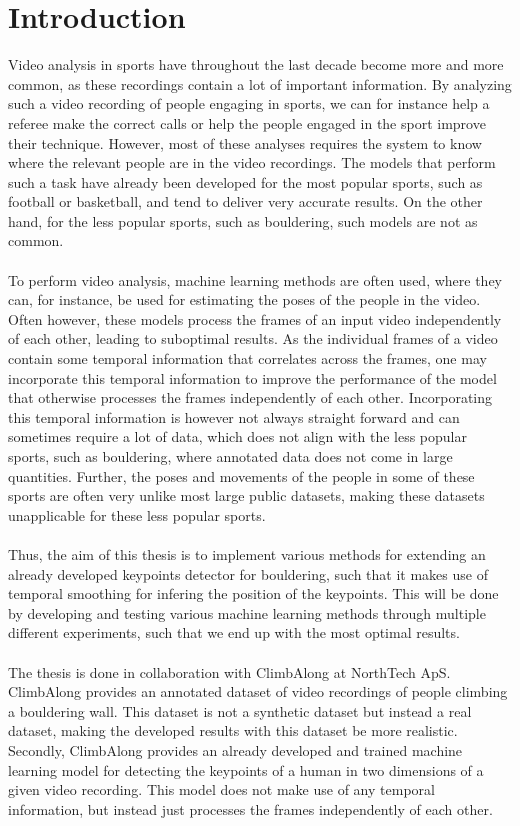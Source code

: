 \documentclass[./main.tex]{subfiles}
\begin{document}
\section{Introduction}
Video analysis in sports have throughout the last decade become more and more common, as these recordings contain a lot of important information. By analyzing such a video recording of people engaging in sports, we can for instance help a referee make the correct calls or help the people engaged in the sport improve their technique. However, most of these analyses requires the system to know where the relevant people are in the video recordings. The models that perform such a task have already been developed for the most popular sports, such as football or basketball, and tend to deliver very accurate results. On the other hand, for the less popular sports, such as bouldering, such models are not as common.
\\
\\
To perform video analysis, machine learning methods are often used, where they can, for instance, be used for estimating the poses of the people in the video. Often however, these models process the frames of an input video independently of each other, leading to suboptimal results. As the individual frames of a video contain some temporal information that correlates across the frames, one may incorporate this temporal information to improve the performance of the model that otherwise processes the frames independently of each other. Incorporating this temporal information is however not always straight forward and can sometimes require a lot of data, which does not align with the less popular sports, such as bouldering, where annotated data does not come in large quantities. Further, the poses and movements of the people in some of these sports are often very unlike most large public datasets, making these datasets unapplicable for these less popular sports.
\\
\\
Thus, the aim of this thesis is to implement various methods for extending an already developed keypoints detector for bouldering, such that it makes use of temporal smoothing for infering the position of the keypoints. This will be done by developing and testing various machine learning methods through multiple different experiments, such that we end up with the most optimal results.
\\
\\
The thesis is done in collaboration with ClimbAlong at NorthTech ApS. ClimbAlong provides an annotated dataset of video recordings of people climbing a bouldering wall. This dataset is not a synthetic dataset but instead a real dataset, making the developed results with this dataset be more realistic. Secondly, ClimbAlong provides an already developed and trained machine learning model for detecting the keypoints of a human in two dimensions of a given video recording. This model does not make use of any temporal information, but instead just processes the frames independently of each other.
\end{document}
